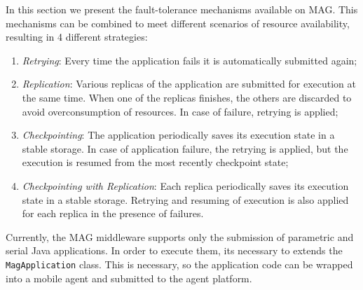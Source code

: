 \documentclass[times, 09pt, twocolumn]{article}
\begin{document}
In this section we present the fault-tolerance mechanisms available on MAG.
This mechanisms can be combined to meet different scenarios of resource
availability, resulting in 4 different strategies:

\begin{enumerate}
    \item \emph{Retrying}: Every time the application fails it is automatically submitted again;
   
    \item \emph{Replication}: Various replicas of the application are submitted
for execution at the same time. When one of the replicas finishes, the others
are discarded to avoid overconsumption of resources. In case of failure,
retrying is applied;
   
    \item \emph{Checkpointing}: The application periodically saves its execution
state in a stable storage. In case of application failure, the retrying is
applied, but the execution is resumed from the most recently checkpoint
state;
 
    \item \emph{Checkpointing with Replication}: Each replica periodically saves
its execution state in a stable storage. Retrying and resuming of execution is
also applied for each replica in the presence of failures.

\end{enumerate}

Currently, the MAG middleware supports only the submission of parametric and
serial Java applications. In order to execute them, its necessary to extends
the {\tt MagApplication} class. This is necessary, so the application code can
be wrapped into a mobile agent and submitted to the agent platform. 
%
%
\end{document}
